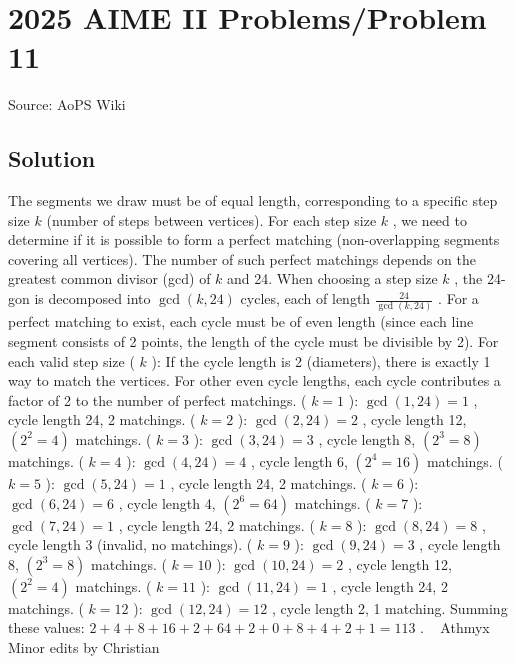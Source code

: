 \documentclass[12pt]{article}
\begin{document}
\section*{{2025 AIME II Problems/Problem 11}}
Source: AoPS Wiki

\subsection*{Solution}
The segments we draw must be of equal length, corresponding to a specific step size $k$ (number of steps between vertices). For each step size $k$ , we need to determine if it is possible to form a perfect matching (non-overlapping segments covering all vertices). The number of such perfect matchings depends on the greatest common divisor (gcd) of $k$ and 24. When choosing a step size $k$ , the 24-gon is decomposed into $\gcd(k, 24)$ cycles, each of length $\frac{24}{\gcd(k, 24)}$ . For a perfect matching to exist, each cycle must be of even length (since each line segment consists of 2 points, the length of the cycle must be divisible by 2). For each valid step size ( $k$ ): If the cycle length is 2 (diameters), there is exactly 1 way to match the vertices. For other even cycle lengths, each cycle contributes a factor of 2 to the number of perfect matchings. ( $k = 1$ ): $\gcd(1, 24) = 1$ , cycle length 24, 2 matchings. ( $k = 2$ ): $\gcd(2, 24) = 2$ , cycle length 12, $(2^2 = 4)$ matchings. ( $k = 3$ ): $\gcd(3, 24) = 3$ , cycle length 8, $(2^3 = 8)$ matchings. ( $k = 4$ ): $\gcd(4, 24) = 4$ , cycle length 6, $(2^4 = 16)$ matchings. ( $k = 5$ ): $\gcd(5, 24) = 1$ , cycle length 24, 2 matchings. ( $k = 6$ ): $\gcd(6, 24) = 6$ , cycle length 4, $(2^6 = 64)$ matchings. ( $k = 7$ ): $\gcd(7, 24) = 1$ , cycle length 24, 2 matchings. ( $k = 8$ ): $\gcd(8, 24) = 8$ , cycle length 3 (invalid, no matchings). ( $k = 9$ ): $\gcd(9, 24) = 3$ , cycle length 8, $(2^3 = 8)$ matchings. ( $k = 10$ ): $\gcd(10, 24) = 2$ , cycle length 12, $(2^2 = 4)$ matchings. ( $k = 11$ ): $\gcd(11, 24) = 1$ , cycle length 24, 2 matchings. ( $k = 12$ ): $\gcd(12, 24) = 12$ , cycle length 2, 1 matching. Summing these values: $2 + 4 + 8 + 16 + 2 + 64 + 2 + 0 + 8 + 4 + 2 + 1 = \boxed{113}$ . ~ Athmyx ~ Minor edits by Christian
\end{document}
